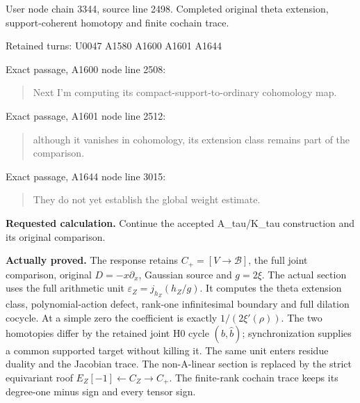 \documentclass[10pt,a4paper,oneside]{report}
\begin{document}
User node \protect{} chain
3344, source line 2498. Completed original theta extension,
support-coherent homotopy and finite cochain trace.

Retained turns: U0047
\protect{} A1580
\protect{} A1600
\protect{} A1601
\protect{} A1644
\protect{}

Exact passage, A1600 node
\protect{} line 2508:

\begin{quote}
Next I'm computing its compact-support-to-ordinary cohomology map.
\end{quote}

Exact passage, A1601 node
\protect{} line 2512:

\begin{quote}
although it vanishes in cohomology, its extension class remains part of
the comparison.
\end{quote}

Exact passage, A1644 node
\protect{} line 3015:

\begin{quote}
They do not yet establish the global weight estimate.
\end{quote}

\textbf{Requested calculation.} Continue the accepted A\_tau/K\_tau
construction and its original comparison.

\textbf{Actually proved.} The response retains \(C_+=[V\to\mathscr B]\),
the full joint comparison, original \(D=-x\partial_x\), Gaussian source
and \(g=2\xi\). The actual section uses the full arithmetic unit
\(\varepsilon_Z=j_{h_Z}(h_Z/g)\). It computes the theta extension class,
polynomial-action defect, rank-one infinitesimal boundary and full
dilation cocycle. At a simple zero the coefficient is exactly
\(1/(2\xi'(\rho))\). The two homotopies differ by the retained joint H0
cycle \((b,\widehat b)\); synchronization supplies a common supported
target without killing it. The same unit enters residue duality and the
Jacobian trace. The non-A-linear section is replaced by the strict
equivariant roof \(E_Z[-1]\leftarrow C_Z\to C_+\). The finite-rank
cochain trace keeps its degree-one minus sign and every tensor sign.
\end{document}
